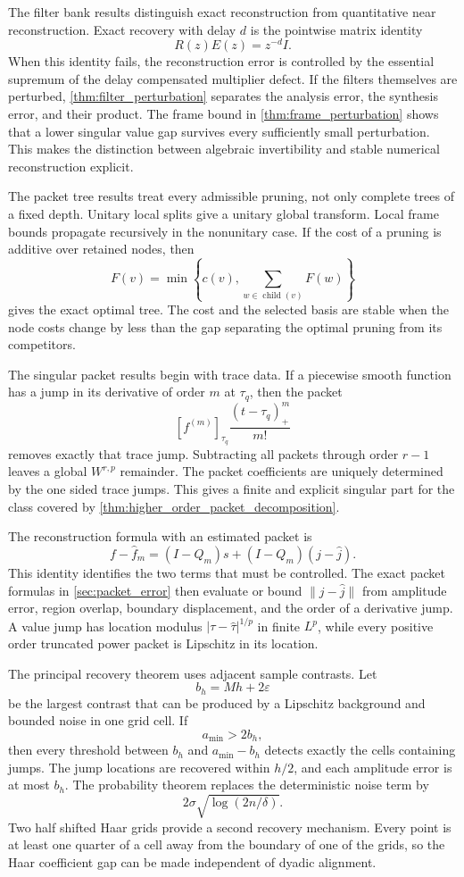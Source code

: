 \documentclass[11pt,a4paper]{article}
\theoremstyle{definition}
\theoremstyle{remark}
\newcommand{\jump}[1]{\left[#1\right]}
\begin{document}
The filter bank results distinguish exact reconstruction from quantitative near reconstruction. Exact recovery with delay \(d\) is the pointwise matrix identity
\[
R(z)E(z)=z^{-d}I.
\]
When this identity fails, the reconstruction error is controlled by the essential supremum of the delay compensated multiplier defect. If the filters themselves are perturbed, \cref{thm:filter_perturbation} separates the analysis error, the synthesis error, and their product. The frame bound in \cref{thm:frame_perturbation} shows that a lower singular value gap survives every sufficiently small perturbation. This makes the distinction between algebraic invertibility and stable numerical reconstruction explicit.

The packet tree results treat every admissible pruning, not only complete trees of a fixed depth. Unitary local splits give a unitary global transform. Local frame bounds propagate recursively in the nonunitary case. If the cost of a pruning is additive over retained nodes, then
\[
F(v)
=
\min\left\{
c(v),
\sum_{w\in\operatorname{child}(v)}F(w)
\right\}
\]
gives the exact optimal tree. The cost and the selected basis are stable when the node costs change by less than the gap separating the optimal pruning from its competitors.

The singular packet results begin with trace data. If a piecewise smooth function has a jump in its derivative of order \(m\) at \(\tau_q\), then the packet
\[
\jump{f^{(m)}}_{\tau_q}
\frac{(t-\tau_q)_+^m}{m!}
\]
removes exactly that trace jump. Subtracting all packets through order \(r-1\) leaves a global \(W^{r,p}\) remainder. The packet coefficients are uniquely determined by the one sided trace jumps. This gives a finite and explicit singular part for the class covered by \cref{thm:higher_order_packet_decomposition}.

The reconstruction formula with an estimated packet is
\[
f-\widehat f_m
=
(I-Q_m)s+(I-Q_m)(j-\widehat j).
\]
This identity identifies the two terms that must be controlled. The exact packet formulas in \cref{sec:packet_error} then evaluate or bound \(\|j-\widehat j\|\) from amplitude error, region overlap, boundary displacement, and the order of a derivative jump. A value jump has location modulus \(|\tau-\widehat\tau|^{1/p}\) in finite \(L^p\), while every positive order truncated power packet is Lipschitz in its location.

The principal recovery theorem uses adjacent sample contrasts. Let
\[
b_h=Mh+2\varepsilon
\]
be the largest contrast that can be produced by a Lipschitz background and bounded noise in one grid cell. If
\[
a_{\min}>2b_h,
\]
then every threshold between \(b_h\) and \(a_{\min}-b_h\) detects exactly the cells containing jumps. The jump locations are recovered within \(h/2\), and each amplitude error is at most \(b_h\). The probability theorem replaces the deterministic noise term by
\[
2\sigma\sqrt{\log(2n/\delta)}.
\]
Two half shifted Haar grids provide a second recovery mechanism. Every point is at least one quarter of a cell away from the boundary of one of the grids, so the Haar coefficient gap can be made independent of dyadic alignment.
\end{document}
